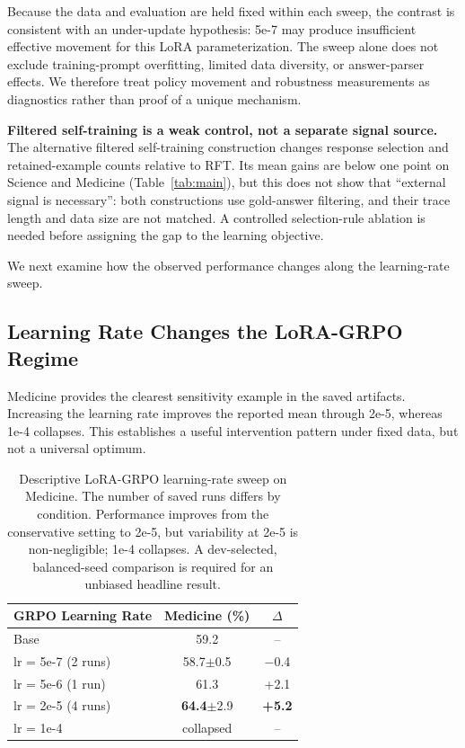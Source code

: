 \documentclass[11pt]{article}
\begin{document}
Because the data and evaluation are held fixed within each sweep, the contrast is consistent with an under-update hypothesis: 5e-7 may produce insufficient effective movement for this LoRA parameterization. The sweep alone does not exclude training-prompt overfitting, limited data diversity, or answer-parser effects. We therefore treat policy movement and robustness measurements as diagnostics rather than proof of a unique mechanism.

\textbf{Filtered self-training is a weak control, not a separate signal source.} The alternative filtered self-training construction changes response selection and retained-example counts relative to RFT. Its mean gains are below one point on Science and Medicine (Table~\ref{tab:main}), but this does not show that ``external signal is necessary'': both constructions use gold-answer filtering, and their trace length and data size are not matched. A controlled selection-rule ablation is needed before assigning the gap to the learning objective.

We next examine how the observed performance changes along the learning-rate sweep.

\subsection{Learning Rate Changes the LoRA-GRPO Regime}

Medicine provides the clearest sensitivity example in the saved artifacts. Increasing the learning rate improves the reported mean through 2e-5, whereas 1e-4 collapses. This establishes a useful intervention pattern under fixed data, but not a universal optimum.

\begin{table}[t]
\centering
\small
\begin{tabular}{lcc}
\toprule
\textbf{GRPO Learning Rate} & \textbf{Medicine (\%)} & \textbf{$\Delta$} \\
\midrule
Base & 59.2 & -- \\
lr = 5e-7 (2 runs) & 58.7$\pm$0.5 & $-$0.4 \\
lr = 5e-6 (1 run) & 61.3 & +2.1 \\
lr = 2e-5 (4 runs) & \textbf{64.4}$\pm$2.9 & \textbf{+5.2} \\
lr = 1e-4 & collapsed & -- \\
\bottomrule
\end{tabular}
\caption{Descriptive LoRA-GRPO learning-rate sweep on Medicine. The number of saved runs differs by condition. Performance improves from the conservative setting to 2e-5, but variability at 2e-5 is non-negligible; 1e-4 collapses. A dev-selected, balanced-seed comparison is required for an unbiased headline result.}
\label{tab:lr_sweep}
\end{table}
\end{document}
